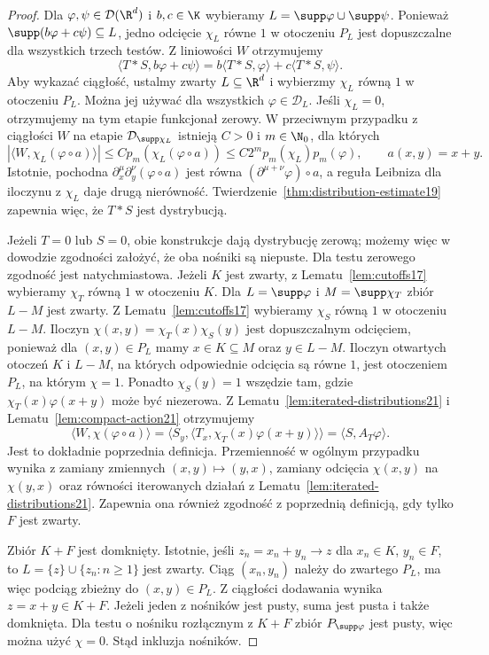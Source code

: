 \begin{proof}
Dla $\varphi,\psi\in\mathcal D(\R^d)$ i $b,c\in\K$
wybieramy $L=\supp\varphi\cup\supp\psi$.
Ponieważ $\supp(b\varphi+c\psi)\subseteq L$,
jedno odcięcie $\chi_L$ równe $1$ w otoczeniu $P_L$
jest dopuszczalne dla wszystkich trzech testów.
Z liniowości $W$ otrzymujemy
\[
 \langle T*S,b\varphi+c\psi\rangle
 =b\langle T*S,\varphi\rangle+c\langle T*S,\psi\rangle.
\]
Aby wykazać ciągłość, ustalmy zwarty $L\subseteq\R^d$
i wybierzmy $\chi_L$ równą $1$ w otoczeniu $P_L$.
Można jej używać dla wszystkich $\varphi\in\mathcal D_L$.
Jeśli $\chi_L=0$, otrzymujemy na tym etapie funkcjonał
zerowy. W przeciwnym przypadku z ciągłości $W$ na etapie
$\mathcal D_{\supp\chi_L}$ istnieją $C>0$ i $m\in\N_0$,
dla których
\[
 |\langle W,\chi_L(\varphi\circ a)\rangle|
 \le C p_m(\chi_L(\varphi\circ a))
 \le C2^m p_m(\chi_L)p_m(\varphi),
 \qquad a(x,y)=x+y.
\]
Istotnie, pochodna $\partial_x^\mu\partial_y^\nu
(\varphi\circ a)$ jest równa
$(\partial^{\mu+\nu}\varphi)\circ a$, a reguła Leibniza
dla iloczynu z $\chi_L$ daje drugą nierówność.
Twierdzenie~\ref{thm:distribution-estimate19} zapewnia
więc, że $T*S$ jest dystrybucją.

Jeżeli $T=0$ lub $S=0$, obie konstrukcje dają
dystrybucję zerową; możemy więc w dowodzie zgodności
założyć, że oba nośniki są niepuste.
Dla testu zerowego zgodność jest natychmiastowa.
Jeżeli $K$ jest zwarty, z Lematu~\ref{lem:cutoffs17}
wybieramy $\chi_T$ równą $1$ w otoczeniu $K$. Dla $L=\supp\varphi$ i
$M=\supp\chi_T$ zbiór $L-M$ jest zwarty.
Z Lematu~\ref{lem:cutoffs17} wybieramy
$\chi_S$ równą $1$ w otoczeniu $L-M$.
Iloczyn $\chi(x,y)=\chi_T(x)\chi_S(y)$ jest dopuszczalnym
odcięciem, ponieważ dla $(x,y)\in P_L$ mamy
$x\in K\subseteq M$ oraz $y\in L-M$.
Iloczyn otwartych otoczeń $K$ i $L-M$, na których
odpowiednie odcięcia są równe $1$, jest otoczeniem
$P_L$, na którym $\chi=1$.
Ponadto $\chi_S(y)=1$ wszędzie tam, gdzie
$\chi_T(x)\varphi(x+y)$ może być niezerowa.
Z Lematu~\ref{lem:iterated-distributions21} i
Lematu~\ref{lem:compact-action21} otrzymujemy
\[
 \langle W,\chi(\varphi\circ a)\rangle
 =\langle S_y,\langle T_x,\chi_T(x)\varphi(x+y)\rangle\rangle
 =\langle S,A_T\varphi\rangle.
\]
Jest to dokładnie poprzednia definicja.
Przemienność w ogólnym przypadku wynika z zamiany
zmiennych $(x,y)\mapsto(y,x)$, zamiany odcięcia
$\chi(x,y)$ na $\chi(y,x)$ oraz równości iterowanych
działań z Lematu~\ref{lem:iterated-distributions21}.
Zapewnia ona również zgodność z poprzednią definicją,
gdy tylko $F$ jest zwarty.

Zbiór $K+F$ jest domknięty. Istotnie, jeśli
$z_n=x_n+y_n\to z$ dla $x_n\in K$, $y_n\in F$,
to $L=\{z\}\cup\{z_n:n\ge1\}$ jest zwarty.
Ciąg $(x_n,y_n)$ należy do zwartego $P_L$, ma więc
podciąg zbieżny do $(x,y)\in P_L$. Z ciągłości
dodawania wynika $z=x+y\in K+F$.
Jeżeli jeden z nośników jest pusty, suma jest pusta
i także domknięta. Dla testu o nośniku rozłącznym
z $K+F$ zbiór $P_{\supp\varphi}$ jest pusty,
więc można użyć $\chi=0$. Stąd inkluzja nośników.


\end{proof}
